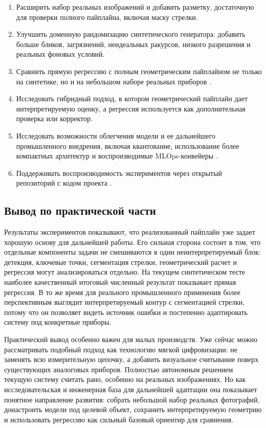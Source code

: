 \documentclass[a4paper,14pt]{extarticle}
\begin{document}
\begin{enumerate}[leftmargin=1.5cm]
		\item Расширить набор реальных изображений и добавить разметку, достаточную для проверки полного пайплайна, включая маску стрелки.
		\item Улучшить доменную рандомизацию синтетического генератора: добавить больше бликов, загрязнений, неидеальных ракурсов, низкого разрешения и реальных фоновых условий.
			\item Сравнить прямую регрессию с полным геометрическим пайплайном не только на синтетике, но и на небольшом наборе реальных приборов \cite{wang2022,coords2023,meterRegression2024}.
			\item Исследовать гибридный подход, в котором геометрический пайплайн дает интерпретируемую оценку, а регрессия используется как дополнительная проверка или корректор.
			\item Исследовать возможности облегчения модели и ее дальнейшего промышленного внедрения, включая квантование, использование более компактных архитектур и воспроизводимые MLOps-конвейеры \cite{quantization2021,mobilenetv2,lightweightInspection2024,mlops2023}.
			\item Поддерживать воспроизводимость экспериментов через открытый репозиторий с кодом проекта \cite{gaugesReaderRepo2026}.

		\end{enumerate}

	\subsection{Вывод по практической части}

		Результаты экспериментов показывают, что реализованный пайплайн уже задает хорошую основу для дальнейшей работы. Его сильная сторона состоит в том, что отдельные компоненты задачи не смешиваются в один неинтерпретируемый блок: детекция, ключевые точки, сегментация стрелки, геометрический расчет и регрессия могут анализироваться отдельно. На текущем синтетическом тесте наиболее качественный итоговый численный результат показывает прямая регрессия. В то же время для реального промышленного применения более перспективным выглядит интерпретируемый контур с сегментацией стрелки, потому что он позволяет видеть источник ошибки и постепенно адаптировать систему под конкретные приборы.

		Практический вывод особенно важен для малых производств. Уже сейчас можно рассматривать подобный подход как технологию мягкой цифровизации: не заменять всю измерительную цепочку, а добавить визуальное считывание поверх существующих аналоговых приборов. Полностью автономным решением текущую систему считать рано, особенно на реальных изображениях. Но как исследовательская и инженерная база для дальнейшей адаптации она показывает понятное направление развития: собрать небольшой набор реальных фотографий, донастроить модели под целевой объект, сохранить интерпретируемую геометрию и использовать регрессию как сильный базовый ориентир для сравнения.
\end{document}
